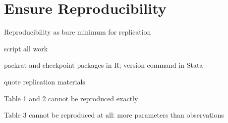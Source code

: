 
\section{Ensure Reproducibility}

Reproducibility as bare minimum for replication

script all work

packrat and checkpoint packages in R; version command in Stata

quote \citet{Newman2015} replication materials

Table 1 and 2 cannot be reproduced exactly

Table 3 cannot be reproduced at all: more parameters than observations
